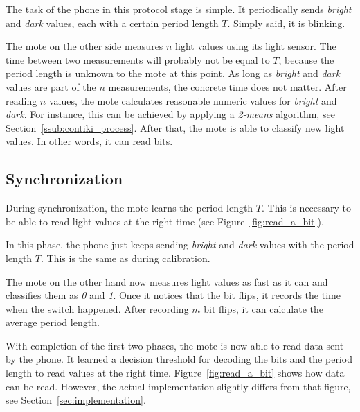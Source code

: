 \documentclass{sig-alternate} %
\begin{document}
The task of the phone in this protocol stage is simple.
It periodically sends \textit{bright} and \textit{dark} values, each with a certain period length $T$.
Simply said, it is blinking.

The mote on the other side measures $n$ light values using its light sensor.
The time between two measurements will probably not be equal to $T$, because the period length is unknown to the mote at this point.
As long as \textit{bright} and \textit{dark} values are part of the $n$ measurements, the concrete time does not matter.
After reading $n$ values, the mote calculates reasonable numeric values for \textit{bright} and \textit{dark}.
For instance, this can be achieved by applying a \mbox{\textit{2-means}} algorithm, see Section~\ref{ssub:contiki_process}.
After that, the mote is able to classify new light values.
In other words, it can read bits.

\subsection{Synchronization}
\label{sub:synchronization}

During synchronization, the mote learns the period length $T$.
This is necessary to be able to read light values at the right time (see Figure~\ref{fig:read_a_bit}).

In this phase, the phone just keeps sending \textit{bright} and \textit{dark} values with the period length $T$.
This is the same as during calibration.

The mote on the other hand now measures light values as fast as it can and classifies them as \textit{0} and \textit{1}.
Once it notices that the bit flips, it records the time when the switch happened.
After recording $m$ bit flips, it can calculate the average period length.

With completion of the first two phases, the mote is now able to read data sent by the phone.
It learned a decision threshold for decoding the bits and the period length to read values at the right time.
Figure~\ref{fig:read_a_bit} shows how data can be read.
However, the actual implementation slightly differs from that figure, see Section~\ref{sec:implementation}.
\end{document}
